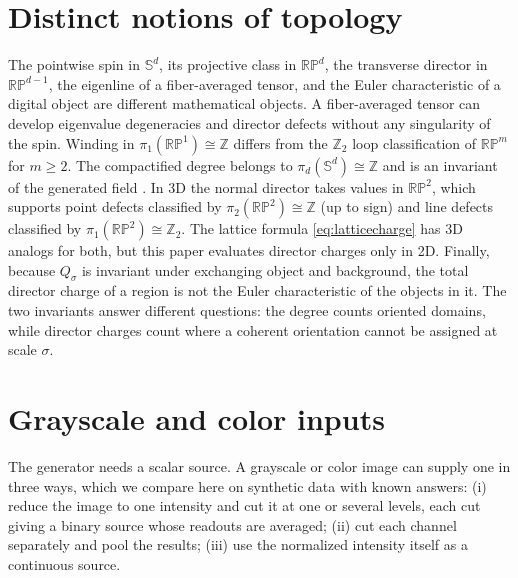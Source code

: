 \documentclass[11pt,a4paper]{article}
\newcommand{\RP}{\mathbb{RP}}
\newcommand{\Sn}{\mathbb S}
\begin{document}
\FloatBarrier
\section{Distinct notions of topology}\label{app:topology}
The pointwise spin in $\Sn^d$, its projective class in $\RP^d$, the transverse director in $\RP^{d-1}$, the eigenline of a fiber-averaged tensor, and the Euler characteristic of a digital object are different mathematical objects. A fiber-averaged tensor can develop eigenvalue degeneracies and director defects without any singularity of the spin. Winding in $\pi_1(\RP^1)\cong\mathbb Z$ differs from the $\mathbb Z_2$ loop classification of $\RP^m$ for $m\ge2$. The compactified degree belongs to $\pi_d(\Sn^d)\cong\mathbb Z$ and is an invariant of the generated field \cite{Mermin1979}. In 3D the normal director takes values in $\RP^2$, which supports point defects classified by $\pi_2(\RP^2)\cong\mathbb Z$ (up to sign) and line defects classified by $\pi_1(\RP^2)\cong\mathbb Z_2$. The lattice formula \eqref{eq:latticecharge} has 3D analogs for both, but this paper evaluates director charges only in 2D. Finally, because $Q_\sigma$ is invariant under exchanging object and background, the total director charge of a region is not the Euler characteristic of the objects in it. The two invariants answer different questions: the degree counts oriented domains, while director charges count where a coherent orientation cannot be assigned at scale $\sigma$.

\section{Grayscale and color inputs}\label{app:gray}
The generator needs a scalar source. A grayscale or color image can supply one in three ways, which we compare here on synthetic data with known answers: (i) reduce the image to one intensity and cut it at one or several levels, each cut giving a binary source whose readouts are averaged; (ii) cut each channel separately and pool the results; (iii) use the normalized intensity itself as a continuous source.
\end{document}
